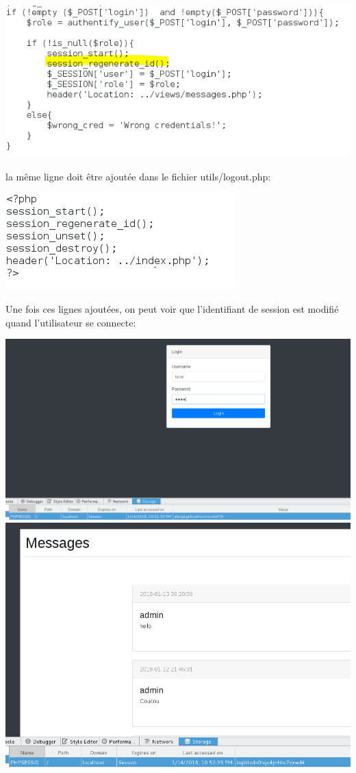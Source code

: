 \documentclass{article}
\begin{document}
\includegraphics[width=\textwidth]{images/session_code.PNG}

la même ligne doit être ajoutée dans le fichier utils/logout.php:

\includegraphics[width=\textwidth]{images/session_logout.PNG}

Une fois ces lignes ajoutées, on peut voir que l'identifiant de session
est modifié quand l'utilisateur se connecte:

\includegraphics[width=\textwidth]{images/session1.PNG}
\includegraphics[width=\textwidth]{images/session2.PNG}
\end{document}

